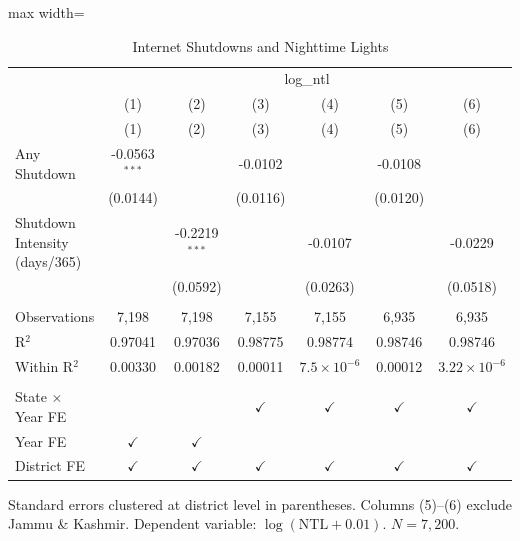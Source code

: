 
\begin{table}[htbp]
   \caption{\label{tab:main} Internet Shutdowns and Nighttime Lights}
   \bigskip
   \centering
   \begin{adjustbox}{max width=\textwidth}
\begin{tabular}{lcccccc}
      \toprule
       & \multicolumn{6}{c}{log\_ntl}\\
                                    & (1)             & (2)             & (3)           & (4)                  & (5)           & (6) \\   
                                    & (1)             & (2)             & (3)           & (4)                  & (5)           & (6)\\  
      \midrule 
      Any Shutdown                  & -0.0563$^{***}$ &                 & -0.0102       &                      & -0.0108       &   \\   
                                    & (0.0144)        &                 & (0.0116)      &                      & (0.0120)      &   \\   
      Shutdown Intensity (days/365) &                 & -0.2219$^{***}$ &               & -0.0107              &               & -0.0229\\   
                                    &                 & (0.0592)        &               & (0.0263)             &               & (0.0518)\\   
       \\
      Observations                  & 7,198           & 7,198           & 7,155         & 7,155                & 6,935         & 6,935\\  
      R$^2$                         & 0.97041         & 0.97036         & 0.98775       & 0.98774              & 0.98746       & 0.98746\\  
      Within R$^2$                  & 0.00330         & 0.00182         & 0.00011       & $7.5\times 10^{-6}$  & 0.00012       & $3.22\times 10^{-6}$\\   
       \\
      State $\times$ Year FE        &                 &                 & $\checkmark$  & $\checkmark$         & $\checkmark$  & $\checkmark$\\   
      Year FE                       & $\checkmark$    & $\checkmark$    &               &                      &               & \\  
      District FE                   & $\checkmark$    & $\checkmark$    & $\checkmark$  & $\checkmark$         & $\checkmark$  & $\checkmark$\\   
      \bottomrule
   \end{tabular}
\end{adjustbox}
   
   \par \raggedright 
   Standard errors clustered at district level in parentheses. Columns (5)--(6) exclude Jammu \& Kashmir. Dependent variable: $\log(\text{NTL} + 0.01)$. $N = 7,200$.
\end{table}


